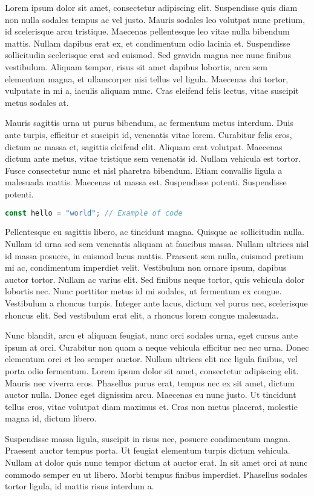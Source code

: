 \documentclass[a4paper,spanish,12pt]{report}
\begin{document}
Lorem ipsum dolor sit amet, consectetur adipiscing elit. Suspendisse quis diam non nulla sodales tempus ac vel justo. Mauris sodales leo volutpat nunc pretium, id scelerisque arcu tristique. Maecenas pellentesque leo vitae nulla bibendum mattis. Nullam dapibus erat ex, et condimentum odio lacinia et. Suspendisse sollicitudin scelerisque erat sed euismod. Sed gravida magna nec nunc finibus vestibulum. Aliquam tempor, risus sit amet dapibus lobortis, arcu sem elementum magna, et ullamcorper nisi tellus vel ligula. Maecenas dui tortor, vulputate in mi a, iaculis aliquam nunc. Cras eleifend felis lectus, vitae suscipit metus sodales at.

Mauris sagittis urna ut purus bibendum, ac fermentum metus interdum. Duis ante turpis, efficitur et suscipit id, venenatis vitae lorem. Curabitur felis eros, dictum ac massa et, sagittis eleifend elit. Aliquam erat volutpat. Maecenas dictum ante metus, vitae tristique sem venenatis id. Nullam vehicula est tortor. Fusce consectetur nunc et nisl pharetra bibendum. Etiam convallis ligula a malesuada mattis. Maecenas ut massa est. Suspendisse potenti. Suspendisse potenti.

\begin{lstlisting}[language=javascript, caption=Code caption]
const hello = "world"; // Example of code
\end{lstlisting}

Pellentesque eu sagittis libero, ac tincidunt magna. Quisque ac sollicitudin nulla. Nullam id urna sed sem venenatis aliquam at faucibus massa. Nullam ultrices nisl id massa posuere, in euismod lacus mattis. Praesent sem nulla, euismod pretium mi ac, condimentum imperdiet velit. Vestibulum non ornare ipsum, dapibus auctor tortor. Nullam ac varius elit. Sed finibus neque tortor, quis vehicula dolor lobortis nec. Nunc porttitor metus id mi sodales, ut fermentum ex congue. Vestibulum a rhoncus turpis. Integer ante lacus, dictum vel purus nec, scelerisque rhoncus elit. Sed vestibulum erat elit, a rhoncus lorem congue malesuada.

Nunc blandit, arcu et aliquam feugiat, nunc orci sodales urna, eget cursus ante ipsum at orci. Curabitur non quam a neque vehicula efficitur nec nec urna. Donec elementum orci et leo semper auctor. Nullam ultrices elit nec ligula finibus, vel porta odio fermentum. Lorem ipsum dolor sit amet, consectetur adipiscing elit. Mauris nec viverra eros. Phasellus purus erat, tempus nec ex sit amet, dictum auctor nulla. Donec eget dignissim arcu. Maecenas eu nunc justo. Ut tincidunt tellus eros, vitae volutpat diam maximus et. Cras non metus placerat, molestie magna id, dictum libero.

Suspendisse massa ligula, suscipit in risus nec, posuere condimentum magna. Praesent auctor tempus porta. Ut feugiat elementum turpis dictum vehicula. Nullam at dolor quis nunc tempor dictum at auctor erat. In sit amet orci at nunc commodo semper eu ut libero. Morbi tempus finibus imperdiet. Phasellus sodales tortor ligula, id mattis risus interdum a.
\end{document}
